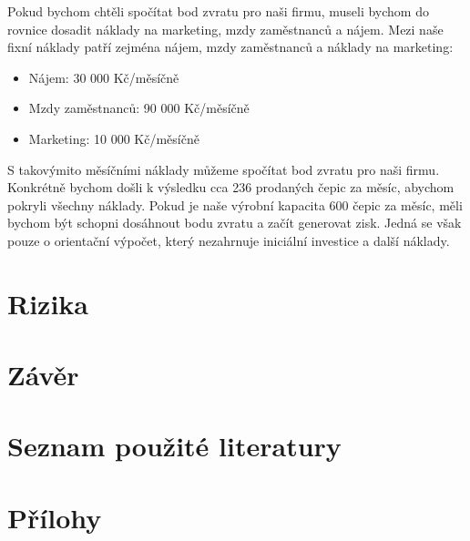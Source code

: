 \documentclass[12pt, a4paper]{article}
\begin{document}
\noindent Pokud bychom chtěli spočítat bod zvratu pro naši firmu, museli bychom do rovnice dosadit náklady na marketing, mzdy zaměstnanců a nájem.
Mezi naše fixní náklady patří zejména nájem, mzdy zaměstnanců a náklady na marketing:
\begin{itemize}
  \item Nájem: 30 000 Kč/měsíčně
  \item Mzdy zaměstnanců: 90 000 Kč/měsíčně
  \item Marketing: 10 000 Kč/měsíčně
\end{itemize}

S takovýmito měsíčními náklady můžeme spočítat bod zvratu pro naši firmu.
Konkrétně bychom došli k výsledku cca 236 prodaných čepic za měsíc, abychom pokryli všechny náklady.
Pokud je naše výrobní kapacita 600 čepic za měsíc, měli bychom být schopni dosáhnout bodu zvratu a začít generovat zisk.
Jedná se však pouze o orientační výpočet, který nezahrnuje iniciální investice a další náklady.

\section{Rizika}
\section{Závěr}
\section{Seznam použité literatury}
\printbibliography[heading=none]
\section{Přílohy}

\listoftables
\end{document}
